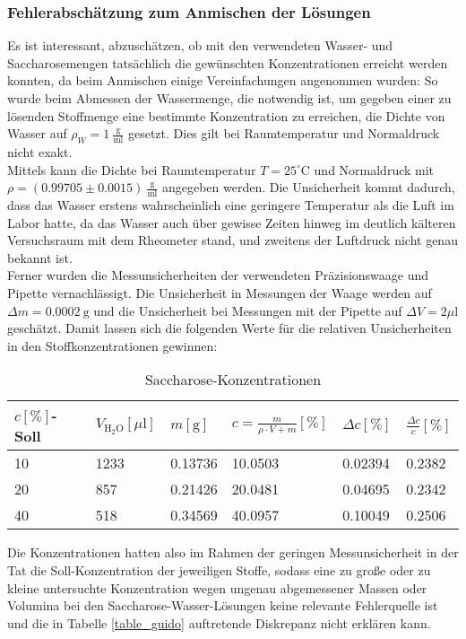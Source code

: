 \documentclass[11pt,a4paper,oneside]{scrartcl}
\begin{document}
\subsubsection{Fehlerabschätzung zum Anmischen der Lösungen}\label{sac_loes_fehler}
Es ist interessant, abzuschätzen, ob mit den verwendeten Wasser- und Saccharosemengen tatsächlich die gewünschten Konzentrationen erreicht werden konnten, da beim Anmischen einige Vereinfachungen angenommen wurden:
So wurde beim Abmessen der Wassermenge, die notwendig ist, um gegeben einer zu lösenden Stoffmenge eine bestimmte Konzentration zu erreichen, die Dichte von Wasser auf $\rho_W=1\ \mathrm{\frac{g}{ml}}$ gesetzt. Dies gilt bei Raumtemperatur und Normaldruck nicht exakt. \\
Mittels \cite{nist_water} kann die Dichte bei Raumtemperatur $T=25^\circ\mathrm C$ und Normaldruck mit $\rho=(0.99705\pm0.0015)\ \mathrm{\frac{g}{ml}}$ angegeben werden. Die Unsicherheit kommt dadurch, dass das Wasser erstens wahrscheinlich eine geringere Temperatur als die Luft im Labor hatte, da das Wasser auch über gewisse Zeiten hinweg im deutlich kälteren Versuchsraum mit dem Rheometer stand, und zweitens der Luftdruck nicht genau bekannt ist. \\
Ferner wurden die Messunsicherheiten der verwendeten Präzisionswaage und Pipette vernachlässigt. Die Unsicherheit in Messungen der Waage werden auf $\Delta m=0.0002\ \mathrm g$ und die Unsicherheit bei Messungen mit der Pipette auf $\Delta V=2\mu\mathrm l$ geschätzt. Damit lassen sich die folgenden Werte für die relativen Unsicherheiten in den Stoffkonzentrationen gewinnen:
\begin{table}[H]
    \centering
    \begin{tabular}{llllll}
    \hline
        $c [\%]$-Soll & $V_{\mathrm{H_2O}} [\mu \mathrm l]$ & $m [\mathrm g]$ & $c=\frac{m}{\rho\cdot V+m}[\%]$ & $\Delta c[\%]$ & $\frac{\Delta c}{c}[\%]$ \\ \hline
        10 & 1233 & 0.13736 & 10.0503 & 0.02394 & 0.2382 \\ 
        20 & 857 & 0.21426 & 20.0481 & 0.04695 & 0.2342 \\ 
        40 & 518 & 0.34569 & 40.0957 & 0.10049 & 0.2506 \\  \hline
    \end{tabular}
\caption{Saccharose-Konzentrationen}
\label{suc_table}
\end{table}
Die Konzentrationen hatten also im Rahmen der geringen Messunsicherheit in der Tat die Soll-Konzentration der jeweiligen Stoffe, sodass eine zu große oder zu kleine untersuchte Konzentration wegen ungenau abgemessener Massen oder Volumina bei den Saccharose-Wasser-Lösungen keine relevante Fehlerquelle ist und die in Tabelle \ref{table_guido} auftretende Diskrepanz nicht erklären kann.
\newpage
\end{document}
